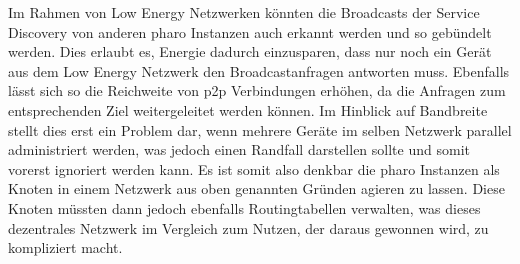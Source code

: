 	Im Rahmen von Low Energy Netzwerken könnten die Broadcasts der Service Discovery von anderen pharo Instanzen auch erkannt werden und so gebündelt werden. Dies erlaubt es, Energie dadurch einzusparen, dass nur noch ein Gerät aus dem Low Energy Netzwerk den Broadcastanfragen antworten muss. Ebenfalls lässt sich so die Reichweite von p2p Verbindungen erhöhen, da die Anfragen zum entsprechenden Ziel weitergeleitet werden können. Im Hinblick auf Bandbreite stellt dies erst ein Problem dar, wenn mehrere Geräte im selben Netzwerk parallel administriert werden, was jedoch einen Randfall darstellen sollte und somit vorerst ignoriert werden kann. Es ist somit also denkbar die pharo Instanzen als Knoten in einem Netzwerk aus oben genannten Gründen agieren zu lassen. Diese Knoten müssten dann jedoch ebenfalls Routingtabellen verwalten, was dieses dezentrales Netzwerk im Vergleich zum Nutzen, der daraus gewonnen wird, zu kompliziert macht.
	
	
